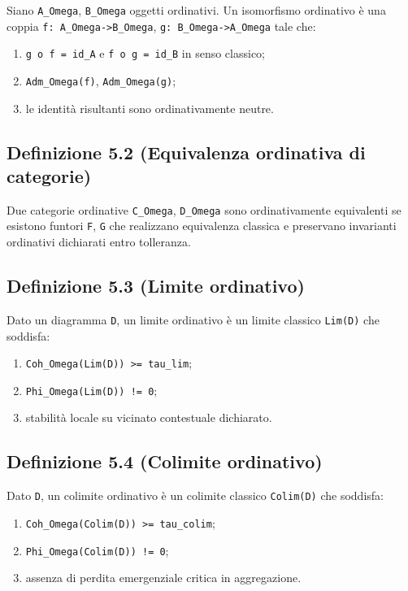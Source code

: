 Siano \texttt{A\_Omega}, \texttt{B\_Omega} oggetti ordinativi. Un isomorfismo ordinativo è una coppia \texttt{f:\ A\_Omega-\textgreater{}B\_Omega}, \texttt{g:\ B\_Omega-\textgreater{}A\_Omega} tale che:

\begin{enumerate}
\def\labelenumi{\arabic{enumi}.}
\tightlist
\item
  \texttt{g\ o\ f\ =\ id\_A} e \texttt{f\ o\ g\ =\ id\_B} in senso classico;
\item
  \texttt{Adm\_Omega(f)}, \texttt{Adm\_Omega(g)};
\item
  le identità risultanti sono ordinativamente neutre.
\end{enumerate}

\subsection{Definizione 5.2 (Equivalenza ordinativa di categorie)}

Due categorie ordinative \texttt{C\_Omega}, \texttt{D\_Omega} sono ordinativamente equivalenti se esistono funtori \texttt{F}, \texttt{G} che realizzano equivalenza classica e preservano invarianti ordinativi dichiarati entro tolleranza.

\subsection{Definizione 5.3 (Limite ordinativo)}

Dato un diagramma \texttt{D}, un limite ordinativo è un limite classico \texttt{Lim(D)} che soddisfa:

\begin{enumerate}
\def\labelenumi{\arabic{enumi}.}
\tightlist
\item
  \texttt{Coh\_Omega(Lim(D))\ \textgreater{}=\ tau\_lim};
\item
  \texttt{Phi\_Omega(Lim(D))\ !=\ 0};
\item
  stabilità locale su vicinato contestuale dichiarato.
\end{enumerate}

\subsection{Definizione 5.4 (Colimite ordinativo)}

Dato \texttt{D}, un colimite ordinativo è un colimite classico \texttt{Colim(D)} che soddisfa:

\begin{enumerate}
\def\labelenumi{\arabic{enumi}.}
\tightlist
\item
  \texttt{Coh\_Omega(Colim(D))\ \textgreater{}=\ tau\_colim};
\item
  \texttt{Phi\_Omega(Colim(D))\ !=\ 0};
\item
  assenza di perdita emergenziale critica in aggregazione.
\end{enumerate}

